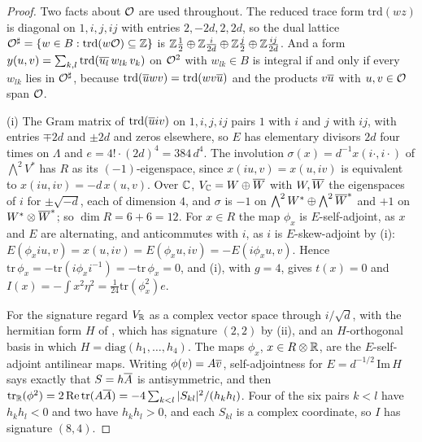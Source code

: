 \begin{proof}
Two facts about $\mathcal{O}$ are used throughout. The reduced trace form
$\mathrm{trd}(wz)$ is diagonal on $1,i,j,ij$ with entries $2,-2d,2,2d$, so
the dual lattice $\mathcal{O}^{\sharp}=\{w\in B:\mathrm{trd}(w\mathcal{O})\subseteq\mathbb{Z}\}$ is
$\mathbb{Z}\tfrac12\oplus\mathbb{Z}\tfrac{i}{2d}\oplus\mathbb{Z}\tfrac{j}{2}\oplus\mathbb{Z}\tfrac{ij}{2d}$.
And a form $y(u,v)=\sum_{k,l}\mathrm{trd}(\overline{u_{l}}\,w_{lk}\,v_{k})$ on
$\mathcal{O}^{2}$ with $w_{lk}\in B$ is integral if and only if every $w_{lk}$ lies
in $\mathcal{O}^{\sharp}$, because $\mathrm{trd}(\overline{u}wv)=\mathrm{trd}(wv\overline{u})$
and the products $v\overline{u}$ with $u,v\in\mathcal{O}$ span $\mathcal{O}$.

(i) The Gram matrix of $\mathrm{trd}(\overline{u}iv)$ on $1,i,j,ij$ pairs $1$
with $i$ and $j$ with $ij$, with entries $\mp2d$ and $\pm2d$ and zeros
elsewhere, so $E$ has elementary divisors $2d$ four times on $\Lambda$ and
$e=4!\cdot(2d)^{4}=384\,d^{4}$. The involution $\sigma(x)=d^{-1}x(i\cdot,i\cdot)$
of $\bigwedge^{2}V^{*}$ has $R$ as its $(-1)$-eigenspace, since
$x(iu,v)=x(u,iv)$ is equivalent to $x(iu,iv)=-d\,x(u,v)$. Over $\mathbb{C}$,
$V_{\mathbb{C}}=W\oplus\overline{W}$ with $W,\overline{W}$ the eigenspaces of $i$ for
$\pm\sqrt{-d}$, each of dimension $4$, and $\sigma$ is $-1$ on
$\bigwedge^{2}W^{*}\oplus\bigwedge^{2}\overline{W}^{*}$ and $+1$ on
$W^{*}\otimes\overline{W}^{*}$; so $\dim R=6+6=12$. For $x\in R$ the map
$\phi_{x}$ is $E$-self-adjoint, as $x$ and $E$ are alternating, and
anticommutes with $i$, as $i$ is $E$-skew-adjoint by
(i): $E(\phi_{x}iu,v)=x(u,iv)=E(\phi_{x}u,iv)=-E(i\phi_{x}u,v)$.
Hence $\mathrm{tr}\,\phi_{x}=-\mathrm{tr}(i\phi_{x}i^{-1})=-\mathrm{tr}\,\phi_{x}=0$,
and (i), with $g=4$, gives $t(x)=0$ and
$I(x)=-\int x^{2}\eta^{2}=\tfrac{1}{24}\mathrm{tr}(\phi_{x}^{2})e$.

For the signature regard $V_{\mathbb{R}}$ as a complex vector space through
$i/\sqrt{d}$, with the hermitian form $H$ of , which has
signature $(2,2)$ by (ii), and an $H$-orthogonal basis in
which $H=\mathrm{diag}(h_{1},\dots,h_{4})$. The maps $\phi_{x}$, $x\in R\otimes\mathbb{R}$,
are the $E$-self-adjoint antilinear maps. Writing $\phi(v)=A\overline{v}$,
self-adjointness for $E=d^{-1/2}\,\mathrm{Im}\,H$ says exactly that
$S=h\overline{A}$ is antisymmetric, and then
$\mathrm{tr}_{\mathbb{R}}(\phi^{2})=2\,\mathrm{Re}\,\mathrm{tr}(A\overline{A})
=-4\sum_{k<l}|S_{kl}|^{2}/(h_{k}h_{l})$. Four of the six pairs $k<l$ have
$h_{k}h_{l}<0$ and two have $h_{k}h_{l}>0$, and each $S_{kl}$ is a complex
coordinate, so $I$ has signature $(8,4)$.


\end{proof}
